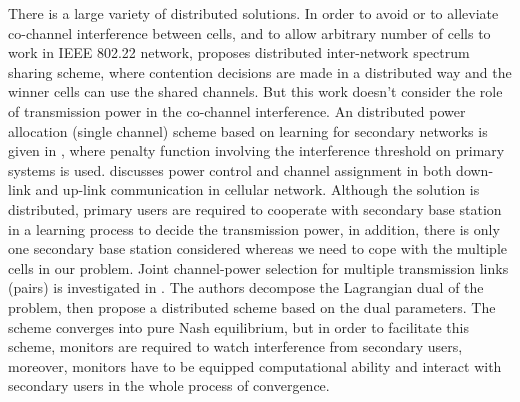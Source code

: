 There is a large variety of distributed solutions.
In order to avoid or to alleviate co-channel interference between cells, and to allow arbitrary number of cells to work in IEEE 802.22 network, \cite{Inter-Network_Spectrum_Sharing_80222_08} proposes distributed inter-network spectrum sharing scheme, where contention decisions are made in a distributed way and the winner cells can use the shared channels.
But this work doesn't consider the role of transmission power in the co-channel interference.
An distributed power allocation (single channel) scheme based on learning for secondary networks is given in \cite{aggregatedInf_Galindo_crowncom09}, where penalty function involving the interference threshold on primary systems is used.
%
\cite{HoangPowerChannel2010} discusses power control and channel assignment in both down-link and up-link communication in cellular network. 
Although the solution is distributed, primary users are required to cooperate with secondary base station in a learning process to decide the transmission power, in addition, there is only one secondary base station considered whereas we need to cope with the multiple cells in our problem.
%
Joint channel-power selection for multiple transmission links (pairs) is investigated in \cite{wuinfocom09}. 
The authors decompose the Lagrangian dual of the problem, then propose a distributed scheme based on the dual parameters. 
The scheme converges into pure Nash equilibrium, but in order to facilitate this scheme, monitors are required to watch interference from secondary users, moreover, monitors have to be equipped computational ability and interact with secondary users in the whole process of convergence.
%


